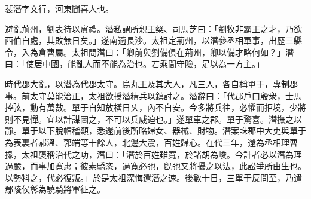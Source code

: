 \begin{pinyinscope}


裴潛字文行，河東聞喜人也。


避亂荊州，劉表待以賔禮。潛私謂所親王粲、司馬芝曰：「劉牧非霸王之才，乃欲西伯自處，其敗無日矣。」遂南適長沙。太祖定荊州，以潛參丞相軍事，出歷三縣令，入為倉曹屬。太祖問潛曰：「卿前與劉備俱在荊州，卿以備才略何如？」潛曰：「使居中國，能亂人而不能為治也。若乘間守險，足以為一方主。」


時代郡大亂，以潛為代郡太守。烏丸王及其大人，凡三人，各自稱單于，專制郡事。前太守莫能治正，太祖欲授潛精兵以鎮討之。潛辭曰：「代郡戶口殷衆，士馬控弦，動有萬數。單于自知放橫日乆，內不自安。今多將兵往，必懼而拒境，少將則不見憚。宜以計謀圖之，不可以兵威迫也。」遂單車之郡。單于驚喜。潛撫之以靜。單于以下脫帽稽顙，悉還前後所略婦女、器械、財物。潛案誅郡中大吏與單于為表裏者郝溫、郭端等十餘人，北邊大震，百姓歸心。在代三年，還為丞相理曹掾，太祖襃稱治代之功，潛曰：「潛於百姓雖寬，於諸胡為峻。今計者必以潛為理過嚴，而事加寬惠；彼素驕恣，過寬必弛，旣弛又將攝之以法，此訟爭所由生也。以勢料之，代必復叛。」於是太祖深悔還潛之速。後數十日，三單于反問至，乃遣鄢陵侯彰為驍騎將軍征之。



\end{pinyinscope}

